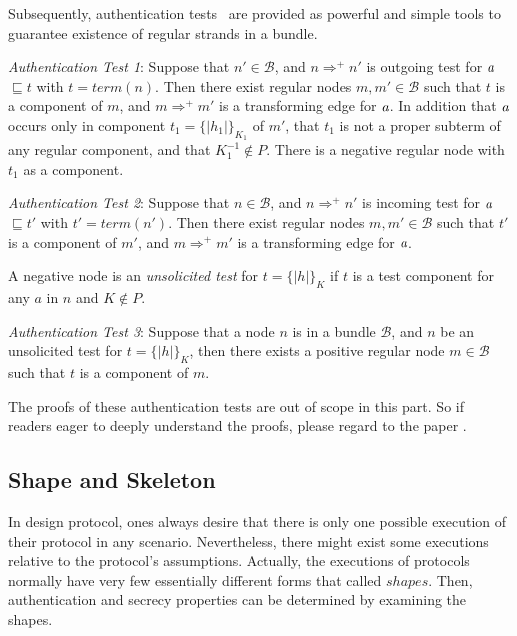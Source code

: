 Subsequently, authentication tests~\cite{authenticationtests} are provided as powerful and simple tools to guarantee existence of regular strands in a bundle. 

\emph{Authentication Test 1}: Suppose that $n' \in \mathcal{B}$, and $n \Rightarrow^+ n'$ is outgoing test for $\emph{a}$ $\sqsubseteq t$ with $t = term(n)$. Then there exist regular nodes $m,m' \in \mathcal{B}$ such that $t$ is a component of $m$, and  $m \Rightarrow^+m'$ is a transforming edge for $\emph{a}$. In addition that $\emph{a}$ occurs only in component $t_1=\{|h_1|\}_{K_1}$ of $m'$, that $t_1$ is not a proper subterm of any regular component, and that $K^{-1}_1 \not\in P$. There is a negative regular node with $t_1$ as a component. 


\emph{Authentication Test 2}: Suppose that $n \in \mathcal{B}$, and $n \Rightarrow^+ n'$ is incoming test for $\emph{a}$ $\sqsubseteq t'$ with $t' = term(n')$. Then there exist regular nodes $m,m' \in \mathcal{B}$ such that $t'$ is a component of $m'$, and  $m \Rightarrow^+m'$ is a transforming edge for $\emph{a}$. 

\begin{Definition} 
A negative node is an \emph{unsolicited test} for $t = \{|h|\}_K$ if $t$ is a test component for any $a$ in $n$ and $K \not\in P$. 
\end{Definition}

\emph{Authentication Test 3}: Suppose that a node $n$ is in a bundle $\mathcal{B}$, and $n$ be an unsolicited test for $t = \{|h|\}_K$, then there exists a positive regular node $m \in \mathcal{B}$ such that $t$ is a component of $m$. 
 
The proofs of these authentication tests are out of scope in this part. So if readers eager to deeply understand the proofs, please regard to the paper \cite{Guttman:2002:ATS:568264.568267}.


\subsection{Shape and Skeleton}

In design protocol, ones always desire that there is only one possible execution of their protocol in any scenario. Nevertheless, there might exist some executions relative to the protocol's assumptions. Actually, the executions of protocols normally have very few essentially different forms that called $shapes$. Then, authentication and secrecy properties can be determined by examining the shapes.

